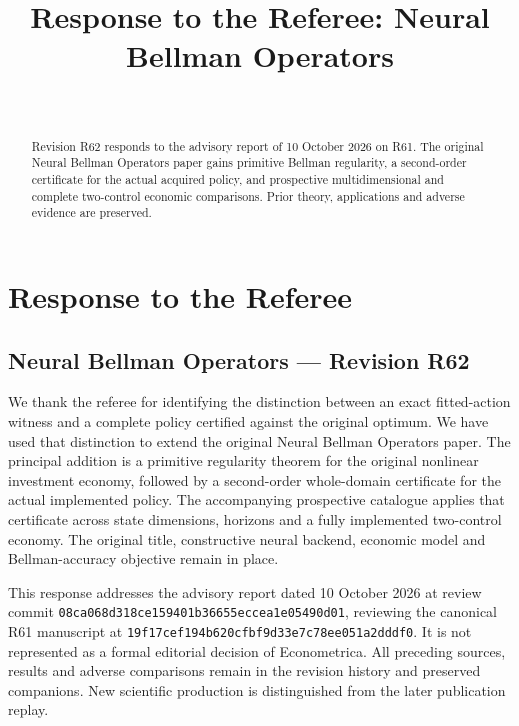 \documentclass[ecta,nameyear,draft]{econsocart}
\begin{document}
\begin{frontmatter}
\title{Response to the Referee: Neural Bellman Operators}
\begin{aug}
\author[id=au1,addressref={add1}]{~}
\address[id=add1]{Peking University}
\end{aug}
\begin{abstract}Revision R62 responds to the advisory report of 10 October 2026 on R61. The original Neural Bellman Operators paper gains primitive Bellman regularity, a second-order certificate for the actual acquired policy, and prospective multidimensional and complete two-control economic comparisons. Prior theory, applications and adverse evidence are preserved.\end{abstract}
\end{frontmatter}
\hypertarget{response-to-the-referee}{%
\section{Response to the Referee}\label{response-to-the-referee}}

\hypertarget{neural-bellman-operators-revision-r62}{%
\subsection{Neural Bellman Operators --- Revision
R62}\label{neural-bellman-operators-revision-r62}}

We thank the referee for identifying the distinction between an exact
fitted-action witness and a complete policy certified against the
original optimum. We have used that distinction to extend the original
Neural Bellman Operators paper. The principal addition is a primitive
regularity theorem for the original nonlinear investment economy,
followed by a second-order whole-domain certificate for the actual
implemented policy. The accompanying prospective catalogue applies that
certificate across state dimensions, horizons and a fully implemented
two-control economy. The original title, constructive neural backend,
economic model and Bellman-accuracy objective remain in place.

This response addresses the advisory report dated 10 October 2026 at
review commit \nolinkurl{08ca068d318ce159401b36655eccea1e05490d01},
reviewing the canonical R61 manuscript at
\nolinkurl{19f17cef194b620cfbf9d33e7c78ee051a2dddf0}. It is not represented
as a formal editorial decision of Econometrica. All preceding sources,
results and adverse comparisons remain in the revision history and
preserved companions. New scientific production is distinguished from
the later publication replay.
\end{document}
